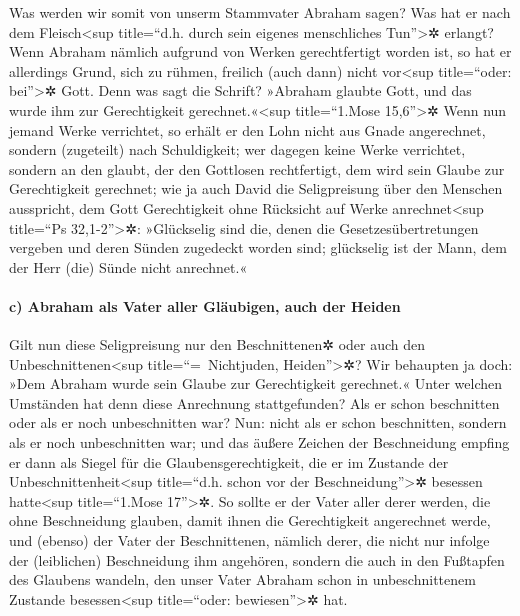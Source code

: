  Was werden wir somit von unserm Stammvater Abraham sagen?
Was hat er nach dem Fleisch\textless sup title=``d.h. durch sein eigenes
menschliches Tun''\textgreater✲ erlangt?  Wenn Abraham
nämlich aufgrund von Werken gerechtfertigt worden ist, so hat er
allerdings Grund, sich zu rühmen, freilich (auch dann) nicht
vor\textless sup title=``oder: bei''\textgreater✲ Gott. 
Denn was sagt die Schrift? »Abraham glaubte Gott, und das wurde ihm zur
Gerechtigkeit gerechnet.«\textless sup title=``1.Mose
15,6''\textgreater✲  Wenn nun jemand Werke verrichtet, so
erhält er den Lohn nicht aus Gnade angerechnet, sondern (zugeteilt) nach
Schuldigkeit;  wer dagegen keine Werke verrichtet, sondern
an den glaubt, der den Gottlosen rechtfertigt, dem wird sein Glaube zur
Gerechtigkeit gerechnet;  wie ja auch David die
Seligpreisung über den Menschen ausspricht, dem Gott Gerechtigkeit ohne
Rücksicht auf Werke anrechnet\textless sup title=``Ps
32,1-2''\textgreater✲:  »Glückselig sind die, denen die
Gesetzesübertretungen vergeben und deren Sünden zugedeckt worden sind;
 glückselig ist der Mann, dem der Herr (die) Sünde nicht
anrechnet.«

\hypertarget{c-abraham-als-vater-aller-gluxe4ubigen-auch-der-heiden}{%
\paragraph{c) Abraham als Vater aller Gläubigen, auch der
Heiden}\label{c-abraham-als-vater-aller-gluxe4ubigen-auch-der-heiden}}

 Gilt nun diese Seligpreisung nur den Beschnittenen✲ oder
auch den Unbeschnittenen\textless sup title=``=~Nichtjuden,
Heiden''\textgreater✲? Wir behaupten ja doch: »Dem Abraham wurde sein
Glaube zur Gerechtigkeit gerechnet.«  Unter welchen
Umständen hat denn diese Anrechnung stattgefunden? Als er schon
beschnitten oder als er noch unbeschnitten war? Nun: nicht als er schon
beschnitten, sondern als er noch unbeschnitten war;  und
das äußere Zeichen der Beschneidung empfing er dann als Siegel für die
Glaubensgerechtigkeit, die er im Zustande der
Unbeschnittenheit\textless sup title=``d.h. schon vor der
Beschneidung''\textgreater✲ besessen hatte\textless sup title=``1.Mose
17''\textgreater✲. So sollte er der Vater aller derer werden, die ohne
Beschneidung glauben, damit ihnen die Gerechtigkeit angerechnet werde,
 und (ebenso) der Vater der Beschnittenen, nämlich derer,
die nicht nur infolge der (leiblichen) Beschneidung ihm angehören,
sondern die auch in den Fußtapfen des Glaubens wandeln, den unser Vater
Abraham schon in unbeschnittenem Zustande besessen\textless sup
title=``oder: bewiesen''\textgreater✲ hat.

